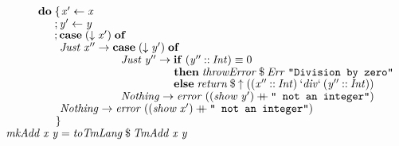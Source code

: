 \documentclass[10pt]{article}
\newcommand{\Conid}[1]{\mathit{#1}}
\newcommand{\Varid}[1]{\mathit{#1}}
\newcommand{\plus}{\mathbin{+\!\!\!+}}
\begin{document}
\begin{tabbing}
${\hskip1.00em\relax\hskip2.00em\relax\phantom{\Varid{\phi}\;\mbox{}}\mathbf{do}\;\{\mskip1.5mu \Varid{x'}\leftarrow \Varid{x}}$\\
${\hskip1.00em\relax\hskip2.00em\relax\phantom{\Varid{\phi}\;\mbox{}}\phantom{\mathbf{do}\;\mbox{}};\Varid{y'}\leftarrow \Varid{y}}$\\
${\hskip1.00em\relax\hskip2.00em\relax\phantom{\Varid{\phi}\;\mbox{}}\phantom{\mathbf{do}\;\mbox{}};\mathbf{case}\;(\Varid{\downarrow}\;\Varid{x'})\;\mathbf{of}}$\\
${\hskip1.00em\relax\hskip2.00em\relax\phantom{\Varid{\phi}\;\mbox{}}\phantom{\mathbf{do}\;\mbox{}}\phantom{;\mbox{}}\Conid{Just}\;\Varid{x''}\to \mathbf{case}\;(\Varid{\downarrow}\;\Varid{y'})\;\mathbf{of}}$\\
${\hskip1.00em\relax\hskip2.00em\relax\phantom{\Varid{\phi}\;\mbox{}}\phantom{\mathbf{do}\;\mbox{}}\phantom{;\mbox{}}\hskip5.50em\relax\Conid{Just}\;\Varid{y''}\to \mathbf{if}\;(\Varid{y''}\mathbin{::}\Conid{Int})\equiv \mathrm{0}}$\\
${\hskip1.00em\relax\hskip2.00em\relax\phantom{\Varid{\phi}\;\mbox{}}\phantom{\mathbf{do}\;\mbox{}}\phantom{;\mbox{}}\hskip5.50em\relax\phantom{\Conid{Just}\;\Varid{y''}\to \mbox{}}\mathbf{then}\;\Varid{throwError}\mathbin{\$}\Conid{Err}\;\text{\tt \char34 Division~by~zero\char34}}$\\
${\hskip1.00em\relax\hskip2.00em\relax\phantom{\Varid{\phi}\;\mbox{}}\phantom{\mathbf{do}\;\mbox{}}\phantom{;\mbox{}}\hskip5.50em\relax\phantom{\Conid{Just}\;\Varid{y''}\to \mbox{}}\mathbf{else}\;\Varid{return}\mathbin{\$}\Varid{\uparrow}\;((\Varid{x''}\mathbin{::}\Conid{Int})\mathbin{\Varid{`div`}}(\Varid{y''}\mathbin{::}\Conid{Int}))}$\\
${\hskip1.00em\relax\hskip2.00em\relax\phantom{\Varid{\phi}\;\mbox{}}\phantom{\mathbf{do}\;\mbox{}}\phantom{;\mbox{}}\hskip5.50em\relax\Conid{Nothing}\to \Varid{error}\;((\Varid{show}\;\Varid{y'})\plus \text{\tt \char34 ~not~an~integer\char34})}$\\
${\hskip1.00em\relax\hskip2.00em\relax\phantom{\Varid{\phi}\;\mbox{}}\phantom{\mathbf{do}\;\mbox{}}\phantom{;\mbox{}}\Conid{Nothing}\to \Varid{error}\;((\Varid{show}\;\Varid{x'})\plus \text{\tt \char34 ~not~an~integer\char34})}$\\
${\hskip1.00em\relax\hskip2.00em\relax\phantom{\Varid{\phi}\;\mbox{}}\phantom{\mathbf{do}\;\mbox{}}\mskip1.5mu\}}$\\
${}$\\
${\hskip1.00em\relax\Varid{mkAdd}\;\Varid{x}\;\Varid{y}\mathrel{=}\Varid{toTmLang}\mathbin{\$}\Conid{TmAdd}\;\Varid{x}\;\Varid{y}}$\\

\end{tabbing}
\end{document}

